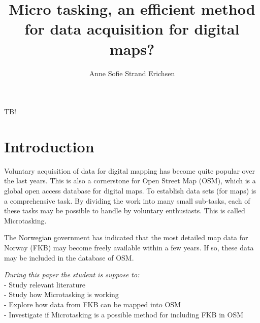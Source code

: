 \documentclass[12pt, a4paper]{report}   	%
\title{Micro tasking, an efficient method for data acquisition for digital maps?}
\author{Anne Sofie Strand Erichsen}
\begin{document}


\setcounter{page}{1}


\abstract
TB!

\chapter{Introduction}\label{sec:intro}

Voluntary acquisition of data for digital mapping has become quite popular over the last years. This is also a cornerstone for Open Street Map (OSM), which is a global open access database for digital maps. To establish data sets (for maps) is a comprehensive task. By dividing the work into many small sub-tasks, each of these tasks may be possible to handle by voluntary enthusiasts. This is called Microtasking.

The Norwegian government has indicated that the most detailed map data for Norway (FKB) may become freely available within a few years. If so, these data may be included in the database of OSM.   

\textit{During this paper the student is suppose to:} \\
- Study relevant literature \\
- Study how Microtasking is working \\
- Explore how data from FKB can be mapped into OSM \\
- Investigate if Microtasking is a possible method for including FKB in OSM \\



\end{document}
